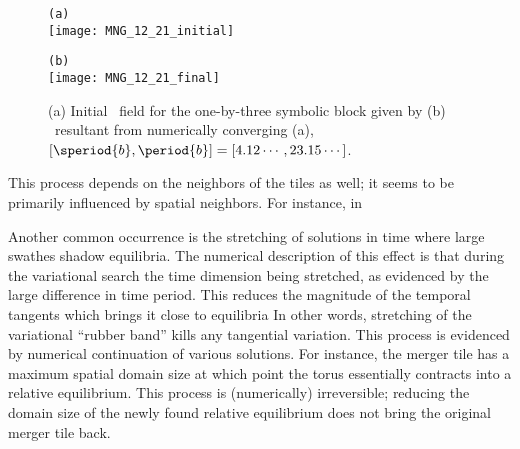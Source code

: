 \begin{description}
{\begin{figure}
\begin{minipage}[height=.4\textheight]{.5\textwidth}
\centering \small{\texttt{(a)}}\\
\texttt{[image: MNG\_12\_21\_initial]}
\end{minipage}
\begin{minipage}[height=.4\textheight]{.5\textwidth}
\centering \small{\texttt{(b)}}\\
\texttt{[image: MNG\_12\_21\_final]}
\end{minipage}
\caption{ \label{fig:block12_21}
(a) Initial \spt\ field for the one-by-three symbolic block given by 
(b) \twoT\ resultant from numerically converging (a),
$[\speriod{b},\period{b}]=[4.12\cdots,23.15\cdots ]$.
}
\end{figure}

This process depends on the neighbors of the tiles as well; it seems to be primarily
influenced by spatial neighbors. For instance, in




Another common occurrence is the stretching of solutions in time where large swathes shadow
equilibria. The numerical description of this effect is that during the variational search
the time dimension being stretched, as evidenced by the large difference in time
period. This reduces the magnitude of the temporal tangents which
brings it close to equilibria In other words, stretching of the
variational ``rubber band'' kills any tangential variation. This process
is evidenced by numerical continuation of various solutions. For instance,
the merger tile has a maximum spatial domain size at which point the torus
essentially contracts into a relative equilibrium. This process is (numerically) irreversible;
reducing the domain size of the newly found relative equilibrium does not
bring the original merger tile back.


}
\end{description}
